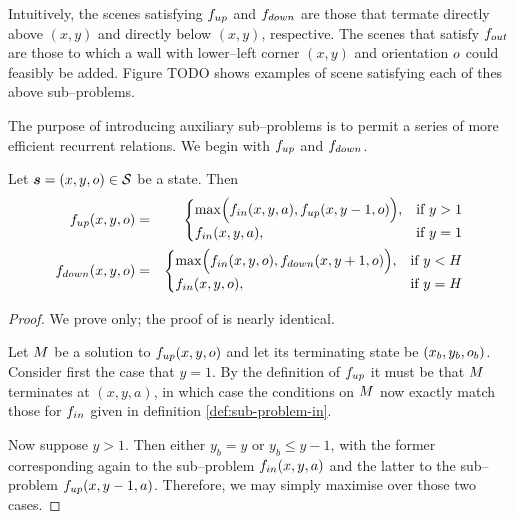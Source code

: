 Intuitively, the scenes satisfying $\SubProbUP$ and $\SubProbDOWN$ are
those that termate directly above $(x,y)$ and directly below $(x,y)$,
respective. The scenes that satisfy $\SubProbOUT$ are those to which a
wall with lower--left corner $(x,y)$ and orientation $\WallOrient$
could feasibly be added. Figure TODO shows examples of scene
satisfying each of thes above sub--problems.

The purpose of introducing auxiliary sub--problems is to permit a
series of more efficient recurrent relations. We begin with
$\SubProbUP$ and $\SubProbDOWN$.

\begin{corollary}
  Let $\State=(x,y,\WallOrient)\in\StateSpace$ be a state. Then
  \begin{eqnarray}
    \label{eq:fup-recurrence}
    \SubProbUP(x,y,\WallOrient) &=& 
    \begin{cases}
      \max \Bigl(\SubProbIN(x,y,a),
                 \SubProbUP(x,y-1,\WallOrient) \Bigr), &
      \mbox{if } y > 1 \\
      \SubProbIN(x,y,a), & \mbox{if } y=1
    \end{cases}\\
    \label{eq:fdown-recurrence}
    \SubProbDOWN(x,y,\WallOrient) &=& 
    \begin{cases}
      \max \Bigl(\SubProbIN(x,y,\WallOrient),
                 \SubProbDOWN(x,y+1,\WallOrient) \Bigr), &
      \mbox{if } y < H \\
      \SubProbIN(x,y,\WallOrient), & \mbox{if } y=H
    \end{cases}
  \end{eqnarray}
\end{corollary}
\begin{proof}
  We prove  only; the proof of
   is nearly identical.

  Let $\Scene$ be a solution to $\SubProbUP(x,y,\WallOrient)$ and let
  its terminating state be $(x_b,y_b,\WallOrient_b)$. Consider first
  the case that $y=1$. By the definition of $\SubProbUP$ it must be
  that $\Scene$ terminates at $(x,y,a)$, in which case the
  conditions on $\Scene$ now exactly match those for $\SubProbIN$
  given in definition \ref{def:sub-problem-in}.

  Now suppose $y>1$. Then either $y_b=y$ or $y_b \leq y-1$, with the
  former corresponding again to the sub--problem $\SubProbIN(x,y,a)$
  and the latter to the sub--problem $\SubProbUP(x,y-1,a)$. Therefore,
  we may simply maximise over those two cases.
\end{proof}  

